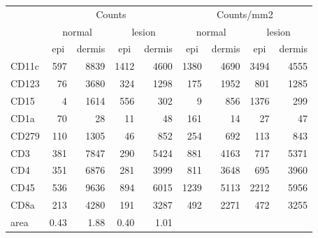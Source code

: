 \documentclass{article}
\begin{document}
\begin{tabular}{lrrrr|rrrr}
   \hline
 
         \multicolumn{1}{c}{} & \multicolumn{4}{c|}{Counts} & \multicolumn{4}{c}{Counts/mm2} \\ 
         \multicolumn{1}{c}{} & \multicolumn{2}{c}{normal} & \multicolumn{2}{c|}{lesion} & \multicolumn{2}{c}{normal} & \multicolumn{2}{c}{lesion}  \\ 
         \multicolumn{1}{c}{} & \multicolumn{1}{c}{epi} & dermis & \multicolumn{1}{c}{epi} & \multicolumn{1}{c|}{dermis} & \multicolumn{1}{c}{epi} & dermis & \multicolumn{1}{c}{epi} & dermis  \\ 
         \hline
    CD11c & 597 & 8839 & 1412 & 4600 & 1380 & 4690 & 3494 & 4555 \\ 
  CD123 & 76 & 3680 & 324 & 1298 & 175 & 1952 & 801 & 1285 \\ 
  CD15 & 4 & 1614 & 556 & 302 & 9 & 856 & 1376 & 299 \\ 
  CD1a & 70 & 28 & 11 & 48 & 161 & 14 & 27 & 47 \\ 
  CD279 & 110 & 1305 & 46 & 852 & 254 & 692 & 113 & 843 \\ 
  CD3 & 381 & 7847 & 290 & 5424 & 881 & 4163 & 717 & 5371 \\ 
  CD4 & 351 & 6876 & 281 & 3999 & 811 & 3648 & 695 & 3960 \\ 
  CD45 & 536 & 9636 & 894 & 6015 & 1239 & 5113 & 2212 & 5956 \\ 
  CD8a & 213 & 4280 & 191 & 3287 & 492 & 2271 & 472 & 3255 \\ 
  area & 0.43 & 1.88 & 0.40 & 1.01 &    &    &    &    \\ 
   \hline
\end{tabular}
\end{document}

